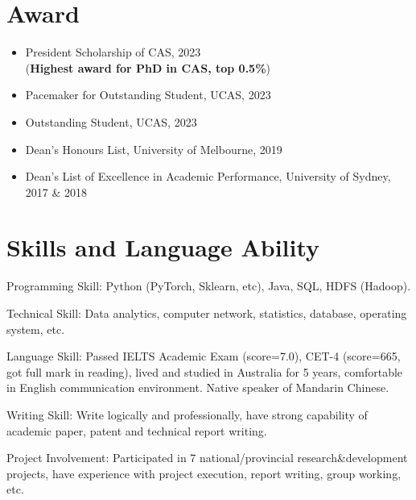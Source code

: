 \documentclass[letterpaper,10.9pt]{article}
\begin{document}

\section{\textbf{Award}}
\vspace{-5mm}
\begin{multicols}{2}
\begin{itemize}
  \setlength\itemsep{2.0pt}
  \item President Scholarship of CAS, 2023\\(\textbf{Highest award for PhD in CAS, top 0.5\%})
  \item Pacemaker for Outstanding Student, UCAS, 2023
  \item Outstanding Student, UCAS, 2023
  \item Dean's Honours List, University of Melbourne, 2019
  \item Dean's List of Excellence in Academic Performance, University of Sydney, 2017 \& 2018
\end{itemize}
\end{multicols}




\section{\textbf{Skills and Language Ability}}
Programming Skill: Python (PyTorch, Sklearn, etc), Java, SQL, HDFS (Hadoop). 

\vspace{2mm}

Technical Skill: Data analytics, computer network, statistics, database, operating system, etc. 

\vspace{2mm}

Language Skill: Passed IELTS Academic Exam (score=7.0), CET-4 (score=665, got full mark in reading), lived and studied in Australia for 5 years, comfortable in English communication environment. Native speaker of Mandarin Chinese. 

\vspace{2mm}

Writing Skill: Write logically and professionally, have strong capability of academic paper, patent and technical report writing. 

\vspace{2mm}

Project Involvement: Participated in 7 national/provincial research\&development projects, have experience with project execution, report writing, group working, etc. 
\end{document}

